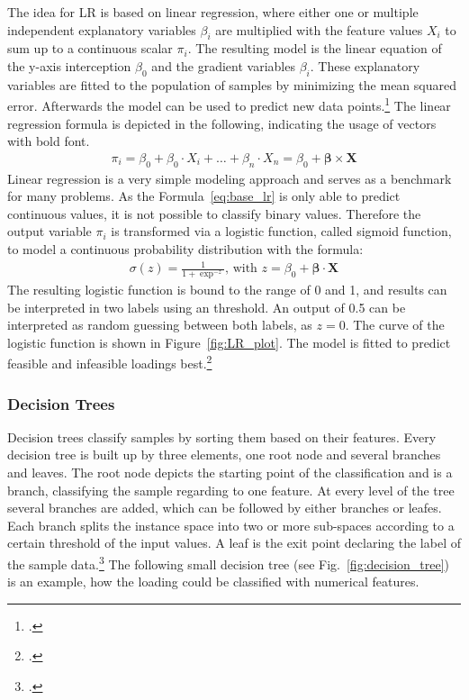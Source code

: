 The idea for \gls{LR} is based on linear regression, where either one or multiple independent explanatory
variables $\beta_i$ are multiplied with the feature values $X_i$ to sum up to a continuous scalar $\pi_i$.
The resulting model is the linear equation of the y-axis interception $\beta_0$
and the gradient variables $\beta_i$.
These explanatory variables are fitted to the population of samples by minimizing the mean squared
error. Afterwards the model can be used to predict new data points.\footcite[cf.][pp. 6-7]{nasteski_overview_2017}
The linear regression formula is depicted in the following, indicating the usage of vectors with bold font.
\begin{align}
    \pi_i=\beta_0+\beta_0 \cdot X_i+\dots+\beta_n \cdot X_n = \beta_0 + \bm{\beta} \times \bm{X}
    \label{eq:base_lr}
\end{align}
Linear regression is a very simple modeling approach and serves as a benchmark for many problems. As the Formula~\ref{eq:base_lr} is only able to predict continuous
values, it is not possible to classify binary values. Therefore the output variable $\pi_i$ is transformed via a logistic function, called sigmoid function,
to model a continuous probability distribution with the formula:
\begin{align}
    \sigma(z)=\frac{1}{1+\exp^{-z}},\, \text{with } z = \beta_0 + \bm{\beta} \cdot \bm{X}
    \label{eq:logistic_func}
\end{align}
The resulting logistic function is bound to the range of 0 and 1, and results can be interpreted
in two labels using an threshold. An output of 0.5 can be interpreted as random
guessing between both labels, as $z=0$. The curve of the logistic function is shown in Figure~\ref{fig:LR_plot}.
The model is fitted to predict feasible and infeasible loadings best.\footcite[cf.][]{kirasich_random_2018}



\subsubsection{Decision Trees}
Decision trees classify samples by sorting them based on their features. Every decision tree
is built up by three elements, one root node and several branches and leaves. The root node
depicts the starting point of the classification and is a branch, classifying the sample
regarding to one feature. At every level of the tree several branches are added, which can be followed
by either branches or leafes. Each branch splits the instance space into two or more sub-spaces
according to a certain threshold of the input values. A leaf is the exit point declaring
the label of the sample data.\footcite[cf.][p.5-6]{nasteski_overview_2017}
The following small decision tree (see Fig.~\ref{fig:decision_tree}) is an example,
how the loading could be classified with numerical features.

